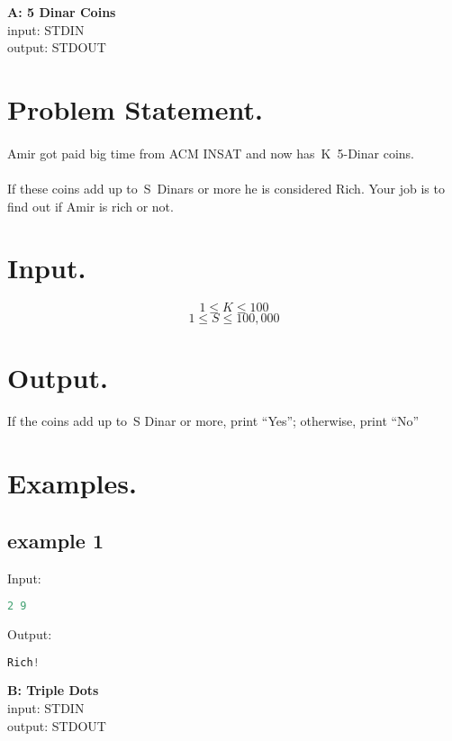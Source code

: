 \documentclass[10pt]{article}
\begin{document}
\begin{center}
    \Huge { \textbf{A: 5 Dinar Coins}} \\ 
    \normalsize  { input:  STDIN}\\
    \normalsize{    output: STDOUT}
\end{center}
\section{Problem Statement.}
\paragraph{}
Amir got paid big time from ACM INSAT and now has K 5-Dinar coins.
\paragraph{}
If these coins add up to S Dinars or more he is considered Rich. Your job is to find out if Amir is rich or not.
\paragraph{}
\section{Input.}
$$ 1\le K \le 100 $$
$$ 1\le S \le 100,000 $$
\section{Output.}

If the coins add up to S Dinar or more, print “Yes”; otherwise, print “No”

\section{Examples.}
\subsection{example 1}
Input:
\begin{lstlisting}[language=Python]
2 9
\end{lstlisting}
Output:
\begin{lstlisting}[language=Python]
Rich!
\end{lstlisting}
\newpage
\begin{center}
    \Huge { \textbf{B: Triple Dots}}\\
    \normalsize  { input:  STDIN}\\
    \normalsize{    output: STDOUT}

\end{center}
\end{document}
